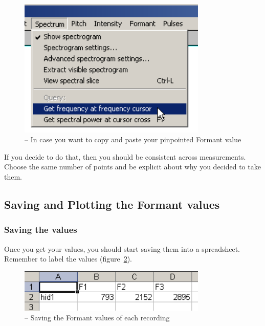 \begin{figure}[!tbp]
\caption{\Praat{} -- In case you want to copy and paste your pinpointed Formant value}
\label{step5measure}
	\begin{center}
		\includegraphics[width=0.8\textwidth]{./figures/PraatSpectrogrGetF1byCursorMenu}
	\end{center}
\end{figure}

If you decide to do that, then you should be consistent across measurements. Choose the same number of points and be explicit about why you decided to take them.  

\subsection{Saving and Plotting the Formant values}

\subsubsection{Saving the values}
Once you get your values, you should start saving them into a spreadsheet. Remember to label the values (figure~\ref{step1save}).

\begin{figure}[!tbp]
\caption{\MSExcel{} -- Saving the Formant values of each recording}
\label{step1save}
	\begin{center}
		\includegraphics[width=0.8\textwidth]{./figures/Excel1}
	\end{center}
\end{figure}

